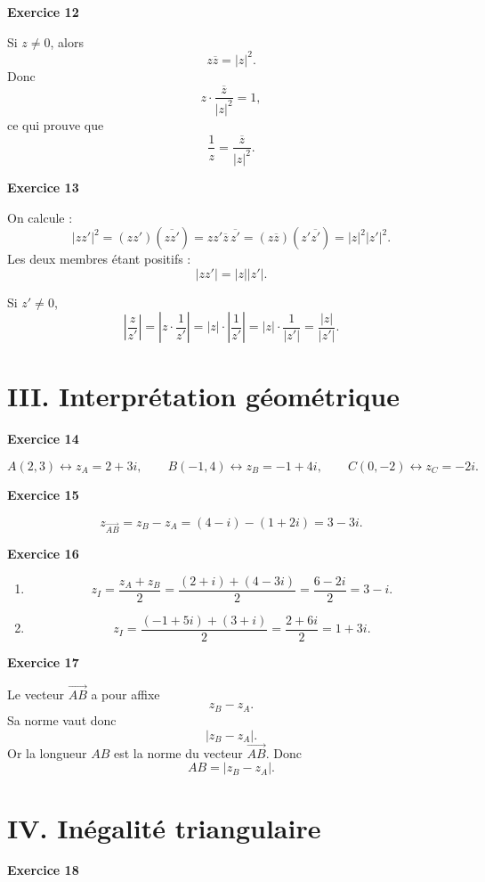 \documentclass[11pt,a4paper]{article}
\begin{document}
\textbf{Exercice 12}

Si \(z\neq 0\), alors
\[
z\overline z=|z|^2.
\]
Donc
\[
z\cdot \frac{\overline z}{|z|^2}=1,
\]
ce qui prouve que
\[
\frac{1}{z}=\frac{\overline z}{|z|^2}.
\]

\textbf{Exercice 13}

On calcule :
\[
|zz'|^2=(zz')(\overline{zz'})=zz'\overline z\,\overline{z'}
=(z\overline z)(z'\overline{z'})=|z|^2|z'|^2.
\]
Les deux membres étant positifs :
\[
|zz'|=|z||z'|.
\]

Si \(z'\neq 0\),
\[
\left|\frac{z}{z'}\right|
=\left|z\cdot \frac{1}{z'}\right|
=|z|\cdot \left|\frac{1}{z'}\right|
=|z|\cdot \frac{1}{|z'|}
=\frac{|z|}{|z'|}.
\]

\section*{III. Interprétation géométrique}

\textbf{Exercice 14}

\[
A(2,3)\longleftrightarrow z_A=2+3i,
\qquad
B(-1,4)\longleftrightarrow z_B=-1+4i,
\qquad
C(0,-2)\longleftrightarrow z_C=-2i.
\]

\textbf{Exercice 15}

\[
z_{\overrightarrow{AB}}=z_B-z_A=(4-i)-(1+2i)=3-3i.
\]

\textbf{Exercice 16}

\begin{enumerate}[label=\alph*)]
    \item
    \[
    z_I=\frac{z_A+z_B}{2}
    =\frac{(2+i)+(4-3i)}{2}
    =\frac{6-2i}{2}=3-i.
    \]

    \item
    \[
    z_I=\frac{(-1+5i)+(3+i)}{2}
    =\frac{2+6i}{2}=1+3i.
    \]
\end{enumerate}

\textbf{Exercice 17}

Le vecteur \(\overrightarrow{AB}\) a pour affixe
\[
z_B-z_A.
\]
Sa norme vaut donc
\[
|z_B-z_A|.
\]
Or la longueur \(AB\) est la norme du vecteur \(\overrightarrow{AB}\). Donc
\[
AB=|z_B-z_A|.
\]

\section*{IV. Inégalité triangulaire}

\textbf{Exercice 18}
\end{document}
